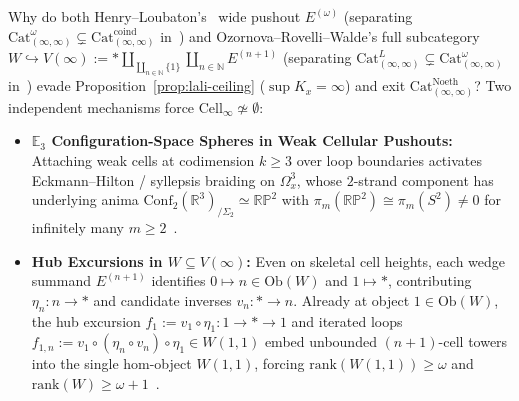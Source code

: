 \documentclass[10pt,twoside,openright]{book}
\theoremstyle{crmplain}
\theoremstyle{crmdef}
\theoremstyle{crmremark}
\begin{document}
Why do both Henry--Loubaton's~\cite{HenryLoubaton25} wide pushout $E^{(\omega)}$ (separating $\mathrm{Cat}^\omega_{(\infty, \infty)} \subsetneq \mathrm{Cat}^{\mathrm{coind}}_{(\infty, \infty)}$ in~\cite[Corollary~5.56]{ORW26}) and Ozornova--Rovelli--Walde's full subcategory $W \hookrightarrow V(\infty) := * \amalg_{\coprod_{n \in \mathbb{N}} \{1\}} \coprod_{n \in \mathbb{N}} E^{(n+1)}$ (separating $\mathrm{Cat}^L_{(\infty, \infty)} \subsetneq \mathrm{Cat}^\omega_{(\infty, \infty)}$ in~\cite[\S 5]{ORW26}) evade Proposition~\ref{prop:lali-ceiling} ($\sup K_x = \infty$) and exit $\mathrm{Cat}^{\mathrm{Noeth}}_{(\infty, \infty)}$? Two independent mechanisms force $\mathrm{Cell}_\infty \not\simeq \emptyset$:
\begin{itemize}[leftmargin=1.5em]
  \item \textbf{$\mathbb{E}_3$ Configuration-Space Spheres in Weak Cellular Pushouts:} Attaching weak cells at codimension $k \ge 3$ over loop boundaries activates Eckmann--Hilton / syllepsis braiding on $\Omega^3_x$, whose $2$-strand component has underlying anima $\mathrm{Conf}_2(\mathbb{R}^3)_{/\Sigma_2} \simeq \mathbb{R}\mathbb{P}^2$ with $\pi_m(\mathbb{R}\mathbb{P}^2) \cong \pi_m(S^2) \neq 0$ for infinitely many $m \ge 2$~\cite{HenryLoubaton25,ORW26}.
  \item \textbf{Hub Excursions in $W \subseteq V(\infty)$:} Even on skeletal cell heights, each wedge summand $E^{(n+1)}$ identifies $0 \mapsto n \in \mathrm{Ob}(W)$ and $1 \mapsto *$, contributing $\eta_n : n \to *$ and candidate inverses $v_n : * \to n$. Already at object $1 \in \mathrm{Ob}(W)$, the hub excursion $f_1 := v_1 \circ \eta_1 : 1 \to * \to 1$ and iterated loops $f_{1, n} := v_1 \circ (\eta_n \circ v_n) \circ \eta_1 \in W(1, 1)$ embed unbounded $(n+1)$-cell towers into the single hom-object $W(1, 1)$, forcing $\mathrm{rank}(W(1, 1)) \ge \omega$ and $\mathrm{rank}(W) \ge \omega + 1$~\cite[\S 5]{ORW26}.
\end{itemize}
\end{document}
